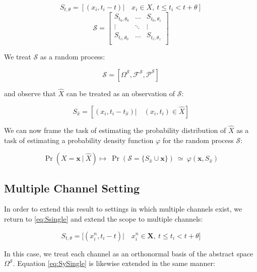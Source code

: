 \documentclass[10pt]{article}
\begin{document}
\begin{equation} \label{eq:Ssingle} S_{t,\theta} = \left[ \left( x_i,t_i - t \right) | \quad x_i \in X, \ t \le t_i < t+\theta \right] \end{equation}
\[ \mathcal{S} = 
\begin{bmatrix} 
S_{t_0,\theta_0} & \hdots & S_{t_0,\theta_z} \\
\vdots & \ddots & \vdots \\
S_{t_\ell, \theta_0} & \hdots & S_{t_\ell, \theta_z} \\
\end{bmatrix}  
\]

We treat \( \mathcal{S} \) as a random process:

\[ \mathcal{S} = [ \Omega^\mathcal{S}, \mathcal{F}^\mathcal{S},\mathcal{P}^\mathcal{S}] \]

 and observe that \( \hat{X} \) can be treated as an observation of \( \mathcal{S} \):

\begin{equation} \label{eq:SySingle} 
S_{\hat{x}} =  \left[ \left( x_i,t_i - t_{\hat{x}} \right) | \quad (x_i,t_i) \in \hat{X} \right] 
\end{equation}

We can now frame the task of estimating the probability distribution of \( \hat{X} \) as a task of estimating a probability density function \( \varphi \) for the random process \( \mathcal{S} \): 

\begin{equation} \label{eq:PrS}
\Pr( X = \mathbf{x} \ | \ \hat{X} ) \mapsto \ \Pr( \mathcal{S} = \{ S_{\hat{x}} \cup \mathbf{x} \} ) \ \simeq \ \varphi( \mathbf{x}, S_{\hat{x}} )
\end{equation}


\subsection{Multiple Channel Setting}

In order to extend this result to settings in which multiple channels exist, we return to \ref{eq:Ssingle} and extend the scope to multiple channels:

\begin{equation} \label{eq:Smultiple} S_{t,\theta} = \big[ \left( x_i^n,t_i - t \right) | \quad x_i^n \in \mathbf{X}, \ t \le t_i < t+\theta \big] \end{equation}

In this case, we treat each channel as an orthonormal basis of the abstract space \( \Omega^\mathcal{S} \).  Equation \ref{eq:SySingle} is likewise extended in the same manner:
\end{document}
